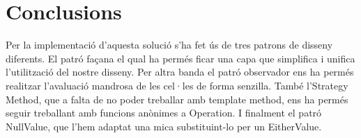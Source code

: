 \documentclass{article}
\begin{document}
	\section{Conclusions}%
Per la implementació d'aquesta solució s'ha fet ús de tres patrons de disseny diferents. El patró façana el qual ha permés ficar una capa que simplifica i unifica l'utilització del nostre disseny. Per altra banda el patró observador ens ha permés realitzar l'avaluació mandrosa de les cel·les de forma senzilla. També l'Strategy Method, que a falta de no poder treballar amb template method, ens ha permés seguir treballant amb funcions anònimes a Operation. I finalment el patró NullValue, que l'hem adaptat una mica substituint-lo per un EitherValue.
\end{document}
